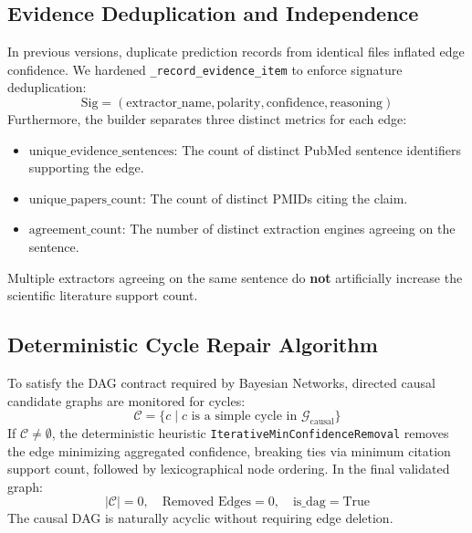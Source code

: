 \documentclass[11pt,a4paper]{article}
\begin{document}
\subsection{Evidence Deduplication and Independence}
In previous versions, duplicate prediction records from identical files inflated edge confidence. We hardened \texttt{\_record\_evidence\_item} to enforce signature deduplication:
\begin{equation}
    \text{Sig} = (\text{extractor\_name}, \text{polarity}, \text{confidence}, \text{reasoning})
\end{equation}
Furthermore, the builder separates three distinct metrics for each edge:
\begin{itemize}[leftmargin=1.5em]
    \item $\text{unique\_evidence\_sentences}$: The count of distinct PubMed sentence identifiers supporting the edge.
    \item $\text{unique\_papers\_count}$: The count of distinct PMIDs citing the claim.
    \item $\text{agreement\_count}$: The number of distinct extraction engines agreeing on the sentence.
\end{itemize}
Multiple extractors agreeing on the same sentence do \textbf{not} artificially increase the scientific literature support count.

\subsection{Deterministic Cycle Repair Algorithm}
To satisfy the DAG contract required by Bayesian Networks, directed causal candidate graphs are monitored for cycles:
\begin{equation}
    \mathcal{C} = \{c \mid c \text{ is a simple cycle in } \mathcal{G}_{\text{causal}}\}
\end{equation}
If $\mathcal{C} \neq \emptyset$, the deterministic heuristic \texttt{IterativeMinConfidenceRemoval} removes the edge minimizing aggregated confidence, breaking ties via minimum citation support count, followed by lexicographical node ordering. In the final validated graph:
\begin{equation}
    |\mathcal{C}| = 0, \quad \text{Removed Edges} = 0, \quad \text{is\_dag} = \text{True}
\end{equation}
The causal DAG is naturally acyclic without requiring edge deletion.

\end{document}
